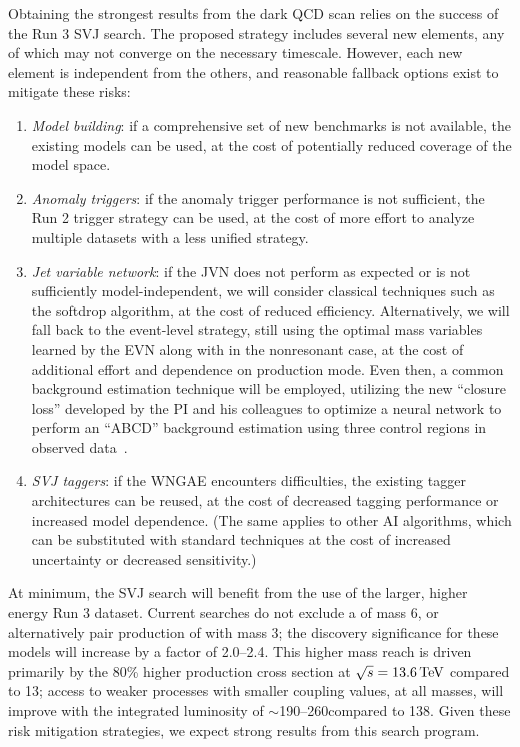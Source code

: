 Obtaining the strongest results from the dark QCD scan relies on the success of the Run 3 SVJ search.
The proposed strategy includes several new elements, any of which may not converge on the necessary timescale.
However, each new element is independent from the others, and reasonable fallback options exist to mitigate these risks:
\begin{enumerate}
\item \textit{Model building}: if a comprehensive set of new benchmarks is not available, the existing models can be used, at the cost of potentially reduced coverage of the model space.
\item \textit{Anomaly triggers}: if the anomaly trigger performance is not sufficient, the Run 2 trigger strategy can be used, at the cost of more effort to analyze multiple datasets with a less unified strategy.
\item \textit{Jet variable network}: if the JVN does not perform as expected or is not sufficiently model-independent, we will consider classical techniques such as the softdrop algorithm, at the cost of reduced efficiency. Alternatively, we will fall back to the event-level strategy, still using the optimal mass variables learned by the EVN along with \ptmiss in the nonresonant case, at the cost of additional effort and dependence on production mode.
Even then, a common background estimation technique will be employed, utilizing the new ``closure loss'' developed by the PI and his colleagues
to optimize a neural network to perform an ``ABCD'' background estimation using three control regions in observed data~\cite{Crossman:2023aps}.
\item \textit{SVJ taggers}: if the WNGAE encounters difficulties, the existing tagger architectures can be reused, at the cost of decreased tagging performance or increased model dependence. (The same applies to other AI algorithms, which can be substituted with standard techniques at the cost of increased uncertainty or decreased sensitivity.)
\end{enumerate}
At minimum, the SVJ search will benefit from the use of the larger, higher energy Run 3 dataset.
Current searches do not exclude a \PZprime of mass 6\TeV, or alternatively pair production of \Pbifun with mass 3\TeV;
the discovery significance for these models will increase by a factor of 2.0--2.4.
This higher mass reach is driven primarily by the 80\% higher production cross section at $\sqrt{s}=13.6\,\text{Te\hspace{-.08em}V}$ compared to 13\TeV;
access to weaker processes with smaller coupling values, at all masses, will improve with the integrated luminosity of ${\sim}$190--260\fbinv compared to 138\fbinv.
Given these risk mitigation strategies, we expect strong results from this search program.
